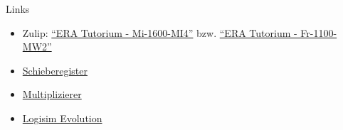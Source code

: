 \documentclass[
  german,            %
  aspectratio=169,    %
]{tumbeamer}
\begin{document}
\begin{frame}[fragile, c]{Links}{}
  \begin{itemize}
    \item Zulip: \href{https://zulip.in.tum.de/#narrow/stream/1917-ERA-Tutorium---Mi-1600-MI4}{\enquote{ERA Tutorium - Mi-1600-MI4}}
    bzw. \href{https://zulip.in.tum.de/#narrow/stream/1940-ERA-Tutorium---Fr-1100-MW2}{\enquote{ERA Tutorium - Fr-1100-MW2}}
    \item \href{https://de.wikipedia.org/wiki/Schieberegister}{Schieberegister}
    \item \href{https://de.wikipedia.org/wiki/Multiplizierer_(Digitaltechnik)}{Multiplizierer}
    \item \href{https://github.com/logisim-evolution/logisim-evolution/releases}{Logisim Evolution}
  \end{itemize}
\end{frame}

\maketitle
\end{document}
